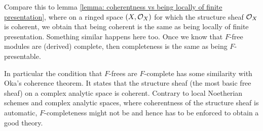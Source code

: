 \begin{remark}
	Compare this to lemma \ref{lemma: coherentness vs being locally of finite presentation}, where on a ringed space $(X,{{\mathcal{O}}_{X}})$ for which the structure sheaf ${{\mathcal{O}}_{X}}$ is coherent, we obtain that being coherent is the same as being locally of finite presentation. Something similar happens here too. Once we know that $F$-free modules are (derived) complete, then completeness is the same as being $F$-presentable.
	
	In particular the condition that $F$-frees are $F$-complete has some similarity with Oka's coherence theorem. It states that the structure sheaf (\ie the most basic free sheaf) on a complex analytic space is coherent. Contrary to local Noetherian schemes and complex analytic spaces, where coherentness of the structure sheaf is automatic, $F$-completeness might not be and hence has to be enforced to obtain a good theory.
\end{remark}

